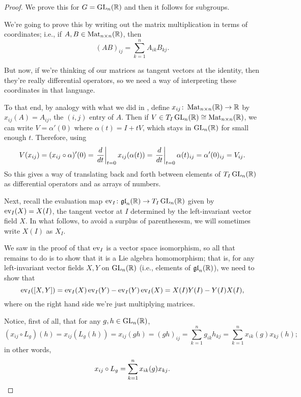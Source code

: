 \begin{proof}
	We prove this for $G = \operatorname{GL}_n(\mathbb{R})$ and then it follows for subgroups.
	
	We're going to prove this by writing out the matrix multiplication in terms of coordinates; i.e., if $A,B \in \operatorname{Mat}_{n \times n}(\mathbb{R})$, then
	\[
		(AB)_{ij} = \sum_{k=1}^n A_{ik}B_{kj}.
	\]
	
	But now, if we're thinking of our matrices as tangent vectors at the identity, then they're really differential operators, so we need a way of interpreting these coordinates in that language.
	
	To that end, by analogy with what we did in , define $x_{ij} \colon\thinspace\! \operatorname{Mat}_{n \times n}(\mathbb{R}) \to \mathbb{R}$ by $x_{ij}(A) = A_{ij}$, the $(i,j)$ entry of $A$. Then if $V \in T_I \operatorname{GL}_n(\mathbb{R}) \cong \operatorname{Mat}_{n \times n}(\mathbb{R})$, we can write $V = \alpha'(0)$ where $\alpha(t) = I + tV$, which stays in $\operatorname{GL}_n(\mathbb{R})$ for small enough $t$. Therefore, using 
	\begin{equation}\label{eq:V(x_{ij})}
		V(x_{ij}) = (x_{ij} \circ \alpha)'(0) = \left. \frac{d}{dt}\right|_{t=0} x_{ij}(\alpha(t)) = \left. \frac{d}{dt}\right|_{t=0} \alpha(t)_{ij} = \alpha'(0)_{ij} = V_{ij}.
	\end{equation}
	So this gives a way of translating back and forth between elements of $T_I\operatorname{GL}_n(\mathbb{R})$ as differential operators and as arrays of numbers.
	
	Next, recall the evaluation map $\operatorname{ev}_I \colon\thinspace\! \mathfrak{gl}_n(\mathbb{R}) \to T_I \operatorname{GL}_n(\mathbb{R})$ given by $\operatorname{ev}_I(X) = X(I)$, the tangent vector at $I$ determined by the left-invariant vector field $X$. In what follows, to avoid a surplus of parenthesesm, we will sometimes write $X(I)$ as $X_I$.
	
	We saw in the proof of  that $\operatorname{ev}_I$ is a vector space isomorphism, so all that remains to do is to show that it is a Lie algebra homomorphism; that is, for any left-invariant vector fields $X,Y$ on $\operatorname{GL}_n(\mathbb{R})$ (i.e., elements of $\mathfrak{gl}_n(\mathbb{R})$), we need to show that
	\[
		\operatorname{ev}_I([X,Y]) = \operatorname{ev}_I(X)\operatorname{ev}_I(Y) - \operatorname{ev}_I(Y)\operatorname{ev}_I(X) = X(I) Y(I) - Y(I) X(I),
	\]
	where on the right hand side we're just multiplying matrices.
	
	Notice, first of all, that for any $g,h \in \operatorname{GL}_n(\mathbb{R})$,
	\[
		\left(x_{ij} \circ L_g\right)(h) = x_{ij}\left(L_g(h)\right) = x_{ij}(gh) = (gh)_{ij} = \sum_{k=1}^n g_{ik}h_{kj} = \sum_{k=1}^n x_{ik}(g) x_{kj}(h);
	\]
	in other words,
	\begin{equation}\label{eq:x_{ij} circ L_g}
		x_{ij} \circ L_g = \sum_{k=1}^n x_{ik}(g) x_{kj}.
	\end{equation}
	

\end{proof}
